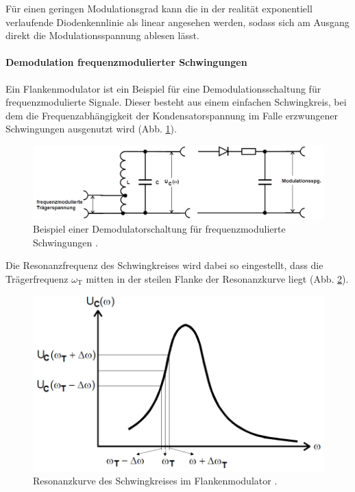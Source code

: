 Für einen geringen Modulationsgrad kann die in der realität exponentiell verlaufende Diodenkennlinie als linear angesehen werden, sodass sich am Ausgang direkt die Modulationsspannung ablesen lässt.

\paragraph{Demodulation frequenzmodulierter Schwingungen}
Ein Flankenmodulator ist ein Beispiel für eine Demodulationsschaltung für frequenzmodulierte Signale.
Dieser besteht aus einem einfachen Schwingkreis, bei dem die Frequenzabhängigkeit der Kondensatorspannung im Falle erzwungener Schwingungen ausgenutzt wird (Abb. \ref{fdm:schaltung}).

\begin{figure}[!h]
    \centering
    \includegraphics[width = 14cm]{images/fdm_schaltung.png}
    \caption{Beispiel einer Demodulatorschaltung für frequenzmodulierte Schwingungen \cite{V59}.}
    \label{fdm:schaltung}
\end{figure}

Die Resonanzfrequenz des Schwingkreises wird dabei so eingestellt, dass die Trägerfrequenz $\omega_\text{T}$ mitten in der steilen Flanke der Resonanzkurve liegt (Abb. \ref{fdm:resonanz}).

\begin{figure}[!h]
    \centering
    \includegraphics[width = 14cm]{images/fdm_resonanz.png}
    \caption{Resonanzkurve des Schwingkreises im Flankenmodulator \cite{V59}.}
    \label{fdm:resonanz}
\end{figure}

